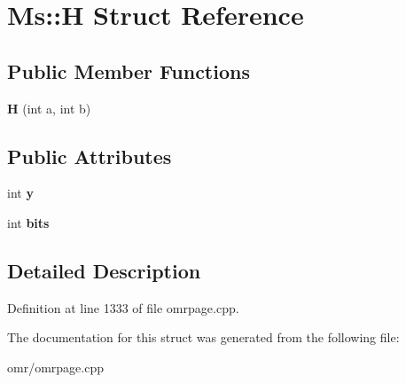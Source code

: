 \hypertarget{struct_ms_1_1_h}{}\section{Ms\+:\+:H Struct Reference}
\label{struct_ms_1_1_h}
\subsection*{Public Member Functions}
\begin{DoxyCompactItemize}
\item 
\mbox{\label{struct_ms_1_1_h_ad4c5b9910922d017b399c38643b55114}} 
{\bfseries H} (int a, int b)
\end{DoxyCompactItemize}
\subsection*{Public Attributes}
\begin{DoxyCompactItemize}
\item 
\mbox{\label{struct_ms_1_1_h_aae9b404d86e0e53585f0385ce09ae3c2}} 
int {\bfseries y}
\item 
\mbox{\label{struct_ms_1_1_h_a4fff2ca34974355f8131c1cef5ad0a4d}} 
int {\bfseries bits}
\end{DoxyCompactItemize}


\subsection{Detailed Description}


Definition at line 1333 of file omrpage.\+cpp.



The documentation for this struct was generated from the following file\+:\begin{DoxyCompactItemize}
\item 
omr/omrpage.\+cpp\end{DoxyCompactItemize}
